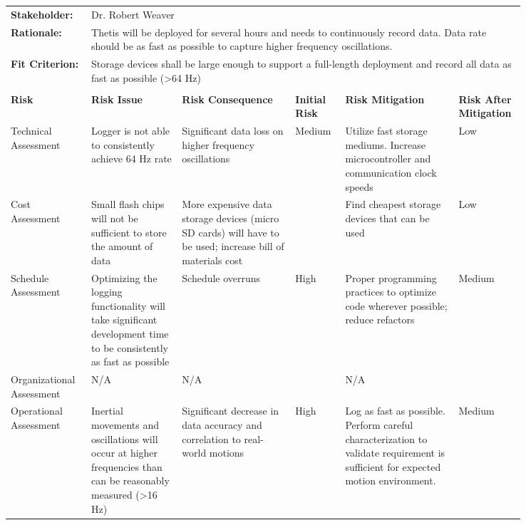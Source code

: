 \begin{landscape}
{\begin{longtable}{| p{0.12\linewidth} | p{0.16\linewidth} |  p{0.20\linewidth} | p{0.08\linewidth} | p{0.20\linewidth} | p{0.08\linewidth} |}
	\hline
	\rowcolor[gray]{0.8}
	\multicolumn{6}{|c|}{ } \\
	\hline
	\textbf{Stakeholder:} & \multicolumn{5}{|l|}{Dr. Robert Weaver} \\
	\hline
	\textbf{Rationale:} & \multicolumn{5}{|p{0.8\linewidth}|}{Thetis will be deployed for several hours and needs to continuously record data. Data rate should be as fast as possible to capture higher frequency oscillations.} \\
	\hline
	\textbf{Fit Criterion:} & \multicolumn{5}{|p{0.8\linewidth}|}{Storage devices shall be large enough to support a full-length deployment and record all data as fast as possible (>64 Hz)} \\
	\hline
	\rowcolor[gray]{0.8}
	\multicolumn{6}{|c|}{ } \\
	\hline
	\textbf{Risk} & \textbf{Risk Issue} & \textbf{Risk Consequence} & \textbf{Initial Risk} & \textbf{Risk Mitigation} & \textbf{Risk \newline After \newline Mitigation} \\
	\hline
	Technical \newline Assessment & Logger is not able to consistently achieve 64 Hz rate & Significant data loss on higher frequency oscillations & \cellcolor{yellow} Medium & Utilize fast storage mediums. \newline Increase microcontroller and communication clock speeds & \cellcolor{green} Low \\
	\hline
	Cost \newline Assessment & Small flash chips will not be sufficient to store the amount of data & More expensive data storage devices (micro SD cards) will have to be used; increase bill of materials cost & \cellcolor{yellow} & Find cheapest storage devices that can be used & \cellcolor{green} Low \\
	\hline
	Schedule \newline Assessment & Optimizing the logging functionality will take significant development time to be consistently as fast as possible & Schedule overruns & \cellcolor{red} High & Proper programming practices to optimize code wherever possible; reduce refactors & \cellcolor{yellow} Medium \\
	\hline
	Organizational \newline Assessment & N/A & N/A & \cellcolor[gray]{0.8}  & N/A & \cellcolor[gray]{0.8}  \\
	\hline
	Operational \newline Assessment & Inertial movements and oscillations will occur at higher frequencies than can be reasonably measured (>16 Hz) & Significant decrease in data accuracy and correlation to real-world motions & \cellcolor{red} High & Log as fast as possible. \newline Perform careful characterization to validate requirement is sufficient for expected motion environment. & \cellcolor{yellow} Medium
	\label{tab:sr09_feasibility}
\end{longtable}
}
\newpage



\end{landscape}
